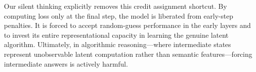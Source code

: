 Our silent thinking explicitly removes this credit assignment shortcut. By computing loss only at the final step, the model is liberated from early-step penalties. It is forced to accept random-guess performance in the early layers and to invest its entire representational capacity in learning the genuine latent algorithm. Ultimately, in algorithmic reasoning---where intermediate states represent unobservable latent computation rather than semantic features---forcing intermediate answers is actively harmful.
